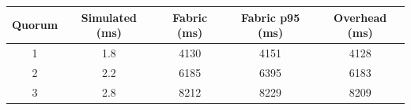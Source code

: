 \begin{tabular}{ccccc}
\toprule
Quorum & Simulated (ms) & Fabric (ms) & Fabric p95 (ms) & Overhead (ms) \\
\midrule
1 & 1.8 & 4130 & 4151 & 4128 \\
2 & 2.2 & 6185 & 6395 & 6183 \\
3 & 2.8 & 8212 & 8229 & 8209 \\
\bottomrule
\end{tabular}